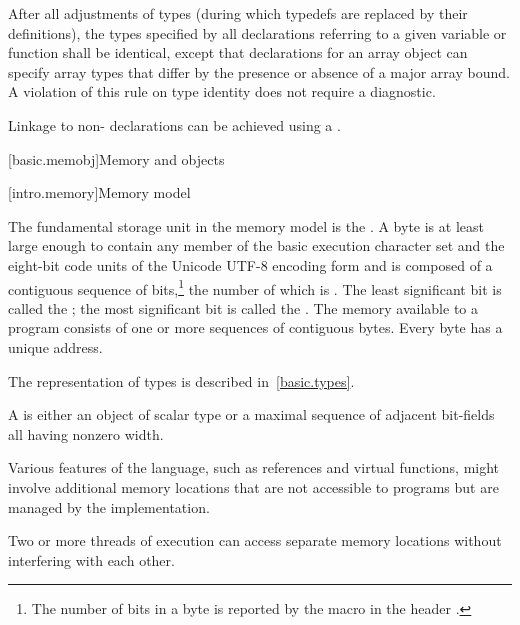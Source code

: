 \pnum
{}%
%
After all adjustments of types (during which
typedefs are replaced by their definitions), the
types specified by all declarations referring to a given variable or
function shall be identical, except that declarations for an array
object can specify array types that differ by the presence or absence of
a major array bound. A violation of this rule on type
identity does not require a diagnostic.

\pnum
\begin{note}
Linkage to non-\Cpp{} declarations can be achieved using a
.
\end{note}

[basic.memobj]{Memory and objects}

[intro.memory]{Memory model}

\pnum
{}%
The fundamental storage unit in the \Cpp{} memory model is the
.
A byte is at least large enough to contain any member of the basic
%
execution character set
and the eight-bit code units of the Unicode UTF-8 encoding form
and is composed of a contiguous sequence of
bits,\footnote{The number of bits in a byte is reported by the macro
 in the header .}
the number of which is . The least
significant bit is called the ; the most
significant bit is called the . The memory
available to a \Cpp{} program consists of one or more sequences of
contiguous bytes. Every byte has a unique address.

\pnum
\begin{note}
The representation of types is described
in~\ref{basic.types}.
\end{note}

\pnum
A  is either an object of scalar type or a maximal
sequence of adjacent bit-fields all having nonzero width.
\begin{note}
Various
features of the language, such as references and virtual functions, might
involve additional memory locations that are not accessible to programs but are
managed by the implementation.
\end{note}
Two or more threads of
execution can access separate memory
locations without interfering with each other.

